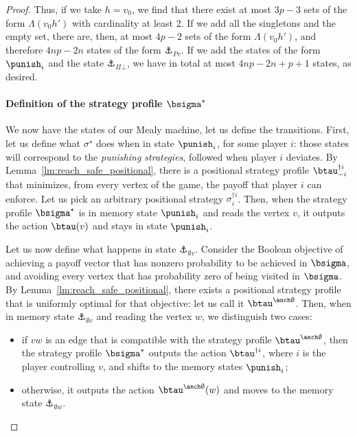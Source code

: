 \begin{proof}
    Thus, if we take $h = v_0$, we find that there exist at most $3p-3$ sets of the form $\Lambda(v_0 h')$ with cardinality at least $2$.
    If we add all the singletons and the empty set, there are, then, at most $4p-2$ sets of the form $\Lambda(v_0 h')$, and therefore $4np-2n$ states of the form $\anchor_{Pv}$.
    If we add the states of the form $\punish_i$ and the state $\anchor_{\Pi\bot}$, we have in total at most $4np-2n+p+1$ states, as desired.


    \paragraph*{Definition of the strategy profile $\bsigma^\star$}

    We now have the states of our Mealy machine, let us define the transitions.
    First, let us define what $\sigma^\star$ does when in state $\punish_i$, for some player $i$: those states will correspond to the \emph{punishing strategies}, followed when player $i$ deviates.
    By Lemma~\ref{lm:reach_safe_positional}, there is a positional strategy profile $\btau^{\dag i}_{-i}$ that minimizes, from every vertex of the game, the payoff that player $i$ can enforce.
    Let us pick an arbitrary positional strategy $\sigma^{\dag i}_i$.
    Then, when the strategy profile $\bsigma^\star$ is in memory state $\punish_i$ and reads the vertex $v$, it outputs the action $\btau(v)$ and stays in state $\punish_i$.
    
    Let us now define what happens in state $\anchor_{\emptyset v}$.
    Consider the Boolean objective of achieving a payoff vector that has nonzero probability to be achieved in $\bsigma$, and avoiding every vertex that has probability zero of being visited in $\bsigma$.
    By Lemma~\ref{lm:reach_safe_positional}, there exists a positional strategy profile that is uniformly optimal for that objective: let us call it $\btau^{\anch \emptyset}$.
    Then, when in memory state $\anchor_{\emptyset v}$ and reading the vertex $w$, we distinguish two cases:
    \begin{itemize}
        \item if $vw$ is an edge that is compatible with the strategy profile $\btau^{\anch \emptyset}$, then the strategy profile $\bsigma^\star$ outputs the action $\btau^{\dag i}$, where $i$ is the player controlling $v$, and shifts to the memory states $\punish_i$;

        \item otherwise, it outputs the action $\btau^{\anch \emptyset}(w)$ and moves to the memory state $\anchor_{\emptyset w}$.
    \end{itemize}


\end{proof}
